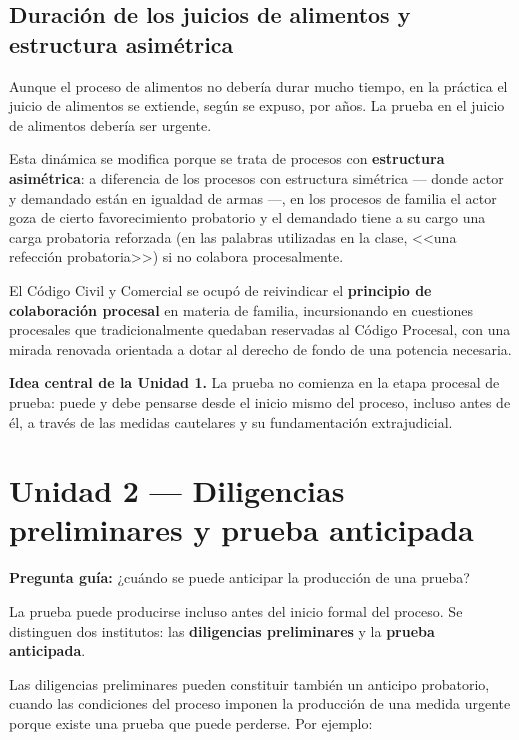 \documentclass[12pt,oneside]{book}
\begin{document}
\subsection{Duración de los juicios de alimentos y estructura asimétrica}

Aunque el proceso de alimentos no debería durar mucho tiempo, en la práctica el juicio de alimentos se extiende, según se expuso, por años. La prueba en el juicio de alimentos debería ser urgente.

Esta dinámica se modifica porque se trata de procesos con \textbf{estructura asimétrica}: a diferencia de los procesos con estructura simétrica --- donde actor y demandado están en igualdad de armas ---, en los procesos de familia el actor goza de cierto favorecimiento probatorio y el demandado tiene a su cargo una carga probatoria reforzada (en las palabras utilizadas en la clase, <<una refección probatoria>>) si no colabora procesalmente.

El Código Civil y Comercial se ocupó de reivindicar el \textbf{principio de colaboración procesal} en materia de familia, incursionando en cuestiones procesales que tradicionalmente quedaban reservadas al Código Procesal, con una mirada renovada orientada a dotar al derecho de fondo de una potencia necesaria.

\begin{important}
\textbf{Idea central de la Unidad 1.} La prueba no comienza en la etapa procesal de prueba: puede y debe pensarse desde el inicio mismo del proceso, incluso antes de él, a través de las medidas cautelares y su fundamentación extrajudicial.
\end{important}

\section{Unidad 2 --- Diligencias preliminares y prueba anticipada}

\textbf{Pregunta guía:} ¿cuándo se puede anticipar la producción de una prueba?

La prueba puede producirse incluso antes del inicio formal del proceso. Se distinguen dos institutos: las \textbf{diligencias preliminares} y la \textbf{prueba anticipada}.

Las diligencias preliminares pueden constituir también un anticipo probatorio, cuando las condiciones del proceso imponen la producción de una medida urgente porque existe una prueba que puede perderse. Por ejemplo:
\end{document}
